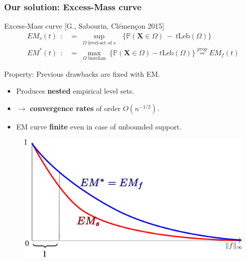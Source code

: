 \documentclass[9pt]{beamer}
\newcommand\blue{\color{blue} }
\def\mb{\mathbf}
\def\leb{\text{Leb}}
\begin{document}
\begin{frame}
\frametitle{Our solution: Excess-Mass curve}
{\blue \large Excess-Mass curve {\small [G., Sabourin, Clémençon 2015]}}
\begin{align*}
EM_s(t) ~~:&=~ \sup_{\Omega \text{ level-set of } s}~~~\big\{ \mathbb{P}(\mb X \in \Omega) ~-~ t \leb(\Omega) \big\}\\
EM^*(t) ~~:&=~ \max_{\Omega\text{ borelian} } ~\big\{{\mathbb{P}} (\mb X\in \Omega)-t\leb(\Omega) \big\} \overset{prop}{=} EM_f(t)
\end{align*}

\begin{alertblock}{Property: Previous drawbacks are fixed with EM.}
\begin{itemize}
\item Produces \textbf{nested} empirical level sets.
\item $\to$ \textbf{convergence rates} of order $O(n^{-1/2})$.
\item EM curve \textbf{finite} even in case of unbounded support.
\end{itemize}
\end{alertblock}


\begin{figure}
\includegraphics[width = 0.6\linewidth]{sourcefigs/em.pdf}
\end{figure}


\end{frame}


\end{document}
